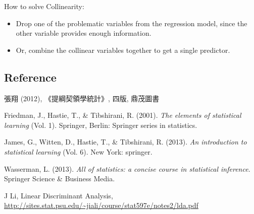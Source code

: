 \documentclass[12pt,a4paper]{article}%
\theoremstyle{definition}
\theoremstyle{plain}
\numberwithin{equation}{section}
\begin{document}
How to solve Collinearity:
\begin{itemize}
\item Drop one of the problematic variables from the regression model, since the other variable provides enough information.
\item Or, combine the collinear variables together to get a single predictor.
\end{itemize}

\begin{CJK}{UTF8}{cwmb}
\section*{Reference}
\noindent
\begin{description}\itemsep=-2pt
\item 張翔 (2012), 《提綱契領學統計》, 四版, 鼎茂圖書
\item Friedman, J., Hastie, T., \& Tibshirani, R. (2001). {\it{The elements of statistical learning}} (Vol. 1). Springer, Berlin: Springer series in statistics.
\item James, G., Witten, D., Hastie, T., \& Tibshirani, R. (2013). {\it{An introduction to statistical learning}} (Vol. 6). New York: springer.
\item Wasserman, L. (2013). {\it{All of statistics: a concise course in statistical inference}}. Springer Science \& Business Media.
\item J Li, Linear Discriminant Analysis, \url{http://sites.stat.psu.edu/~jiali/course/stat597e/notes2/lda.pdf}
\end{description}
\end{CJK}
\end{document}
